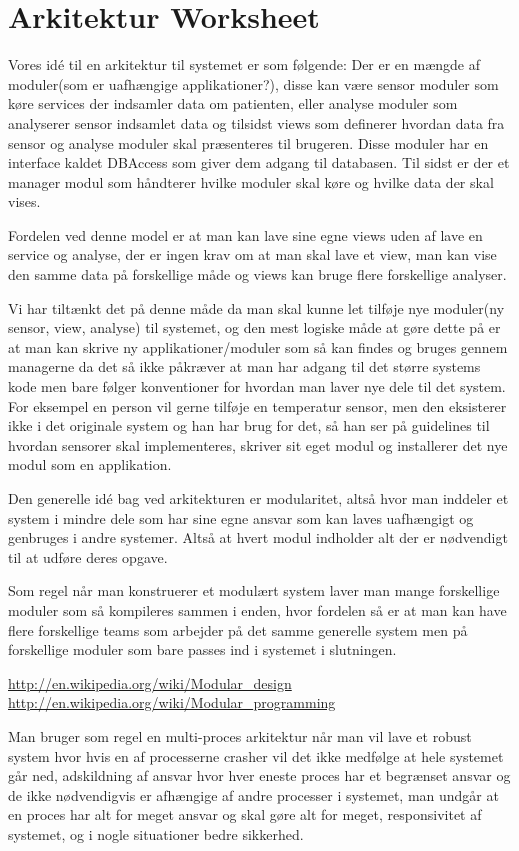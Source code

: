 \chapter{Arkitektur Worksheet}
Vores idé til en arkitektur til systemet er som følgende:
Der er en mængde af moduler(som er uafhængige applikationer?), disse kan være sensor moduler som køre services der indsamler data om patienten, eller analyse moduler som analyserer sensor indsamlet data og tilsidst views som definerer hvordan data fra sensor og analyse moduler skal præsenteres til brugeren. Disse moduler har en interface kaldet DBAccess som giver dem adgang til databasen. Til sidst er der et manager modul som håndterer hvilke moduler skal køre og hvilke data der skal vises.

Fordelen ved denne model er at man kan lave sine egne views uden af lave en service og analyse, der er ingen krav om at man skal lave et view, man kan vise den samme data på forskellige måde og views kan bruge flere forskellige analyser.

Vi har tiltænkt det på denne måde da man skal kunne let tilføje nye moduler(ny sensor, view, analyse) til systemet, og den mest logiske måde at gøre dette på er at man kan skrive ny applikationer/moduler som så kan findes og bruges gennem managerne da det så ikke påkræver at man har adgang til det større systems kode men bare følger konventioner for hvordan man laver nye dele til det system. For eksempel en person vil gerne tilføje en temperatur sensor, men den eksisterer ikke i det originale system og han har brug for det, så han ser på guidelines til hvordan sensorer skal implementeres, skriver sit eget modul og installerer det nye modul som en applikation.

Den generelle idé bag ved arkitekturen er modularitet, altså hvor man inddeler et system i mindre dele som har sine egne ansvar som kan laves uafhængigt og genbruges i andre systemer. Altså at hvert modul indholder alt der er nødvendigt til at udføre deres opgave.

Som regel når man konstruerer et modulært system laver man mange forskellige moduler som så kompileres sammen i enden, hvor fordelen så er at man kan have flere forskellige teams som arbejder på det samme generelle system men på forskellige moduler som bare passes ind i systemet i slutningen. 

\url{http://en.wikipedia.org/wiki/Modular_design}
\url{http://en.wikipedia.org/wiki/Modular_programming}

Man bruger som regel en multi-proces arkitektur når man vil lave et robust system hvor hvis en af processerne crasher vil det ikke medfølge at hele systemet går ned, adskildning af ansvar hvor hver eneste proces har et begrænset ansvar og de ikke nødvendigvis er afhængige af andre processer i systemet, man undgår at en proces har alt for meget ansvar og skal gøre alt for meget, responsivitet af systemet, og i nogle situationer bedre sikkerhed.

